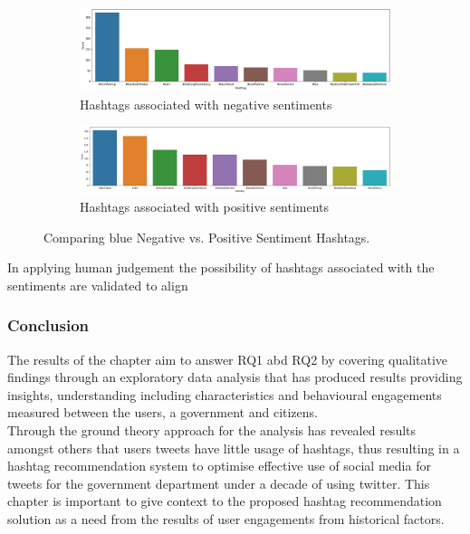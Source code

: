 \begin{figure}
      \centering
	    \begin{subfigure}{0.1\linewidth}
		\includegraphics[width=\linewidth]{postgrad_template 2/chapters/chapter3/Sentiments Hashtag Negative.png}
		\caption{Hashtags associated with negative sentiments}
		\label{fig:subfig1}
	   \end{subfigure}
	   \begin{subfigure}{0.1\linewidth}
		\includegraphics[width=\linewidth]{postgrad_template 2/chapters/chapter3/Hashtag Sentiments Positive.png}
		\caption{Hashtags associated with positive sentiments}
		\label{fig:subfig2}
	    \end{subfigure}
	   \vfill
	 \caption{Comparing blue Negative vs. Positive Sentiment Hashtags.}
\end{figure}

In applying human judgement the possibility of hashtags associated with the sentiments are validated to align\\ 

\subsubsection{Conclusion}

The results of the chapter aim to answer RQ1 abd RQ2 by covering qualitative findings through an exploratory data analysis that has produced results providing insights, understanding including characteristics and behavioural engagements measured between the users, a government and  citizens.\\  Through the ground theory approach for the analysis has revealed results amongst others that users tweets have little usage of hashtags, thus resulting in a hashtag recommendation system to optimise effective use of social media for tweets for the government department under a decade of using twitter.  This chapter is important to give context to the proposed hashtag recommendation solution as a need from the results of user engagements from historical factors.  

